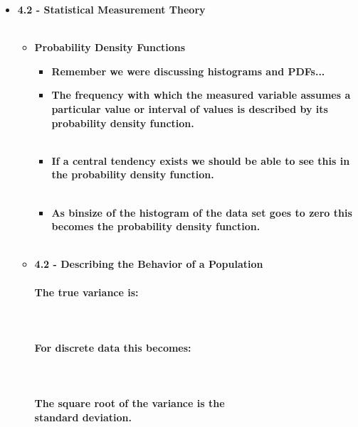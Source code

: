 \documentclass[11pt]{article}
\newcommand{\B}{\color{blue}}
\newcommand{\G}{\color{mygreen}}
\newcommand{\PR}{\color{mypurple}}
\begin{document}
\begin{itemize}



		
	\item \textbf{ \LARGE 4.2 -  Statistical Measurement Theory  } \\\\
	\begin{itemize}
		

		\item \textbf{ \LARGE Probability Density Functions  } \\
		\begin{itemize}

			\item  \textbf{ \Large Remember we were discussing histograms and PDFs...}\\

			\item \textbf{ \Large The frequency with which the measured variable assumes a particular value or interval of values is described by its {\bf \B probability density function}.} \\\\ 

                               \item \textbf{ \Large If a {\bf \PR central tendency} exists we should be able to see this in the {\bf \B probability density function}.} \\\\ 
                               
                               \item \textbf{ \Large As binsize of the {\bf \G histogram} of the data set goes to zero this becomes the {\bf \B probability density function}.} \\\\ 
                                
		\end{itemize}
		
		\newpage
		\item \textbf{ \LARGE 4.2 -  Describing the Behavior of a Population  } \\\\
		
		\textbf{ \LARGE The true variance is:}\\\\
		 \\\\
		\textbf{ \LARGE For discrete data this becomes:}\\\\
		\\\\
		\textbf{\LARGE The square root of the {\bf \B variance} is the \\{\bf \PR standard deviation}.}\\\\
		

\end{itemize}
\end{itemize}
\end{document}
